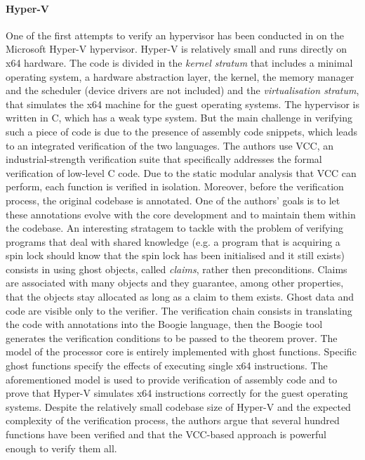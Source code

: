 \paragraph{Hyper-V}
One of the first attempts to verify an hypervisor has been conducted in \cite{verifyhyperv} on the Microsoft Hyper-V hypervisor. Hyper-V is relatively small and runs directly on x64 hardware. The code is divided in the \emph{kernel stratum} that includes a minimal operating system, a hardware abstraction layer, the kernel, the memory manager and the scheduler (device drivers are not included) and the \emph{virtualisation stratum}, that simulates the x64 machine for the guest operating systems. The hypervisor is written in C, which has a weak type system. But the main challenge in verifying such a piece of code is due to the presence of assembly code snippets, which leads to an integrated verification of the two languages. 
The authors use VCC, an industrial-strength verification suite that specifically addresses the formal verification of low-level C code.
Due to the static modular analysis that VCC can perform, each function is verified in isolation. Moreover, before the verification process, the original codebase is annotated. One of the authors' goals is to let these annotations evolve with the core development and to maintain them within the codebase. 
An interesting stratagem to tackle with the problem of verifying programs that deal with shared knowledge (e.g. a program that is acquiring a spin lock should know that the spin lock has been initialised and it still exists) consists in using ghost objects, called \emph{claims}, rather then preconditions. Claims are associated with many objects and they guarantee, among other properties, that the objects stay allocated as long as a claim to them exists. Ghost data and code are visible only to the verifier.
The verification chain consists in translating the code with annotations into the Boogie language, then the Boogie tool generates the verification conditions to be passed to the theorem prover.
The model of the processor core is entirely implemented with ghost functions. Specific ghost functions specify the effects of executing single x64 instructions.  The aforementioned model is used to provide verification of assembly code and to prove that Hyper-V simulates x64 instructions correctly for the guest operating systems.
Despite the relatively small codebase size of Hyper-V and the expected complexity of the verification process, the authors argue that several hundred functions have been verified and that the VCC-based approach is powerful enough to verify them all.

